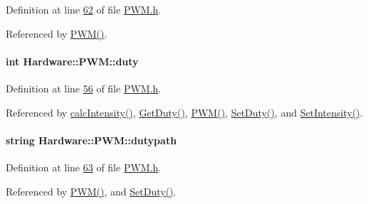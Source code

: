 Definition at line \hyperlink{_p_w_m_8h_source_l00062}{62} of file \hyperlink{_p_w_m_8h_source}{P\+W\+M.\+h}.



Referenced by \hyperlink{_p_w_m_8cpp_source_l00015}{P\+W\+M()}.

\hypertarget{class_hardware_1_1_p_w_m_a3309b2645c4c817384d91f33f0df5d64}{}
\paragraph[{duty}]{\setlength{\rightskip}{0pt plus 5cm}int Hardware\+::\+P\+W\+M\+::duty\hspace{0.3cm}{\ttfamily [private]}}\label{class_hardware_1_1_p_w_m_a3309b2645c4c817384d91f33f0df5d64}


Definition at line \hyperlink{_p_w_m_8h_source_l00056}{56} of file \hyperlink{_p_w_m_8h_source}{P\+W\+M.\+h}.



Referenced by \hyperlink{_p_w_m_8cpp_source_l00070}{calc\+Intensity()}, \hyperlink{_p_w_m_8h_source_l00041}{Get\+Duty()}, \hyperlink{_p_w_m_8cpp_source_l00015}{P\+W\+M()}, \hyperlink{_p_w_m_8cpp_source_l00126}{Set\+Duty()}, and \hyperlink{_p_w_m_8cpp_source_l00090}{Set\+Intensity()}.

\hypertarget{class_hardware_1_1_p_w_m_a53311e9df6960751465d5f0b81192226}{}
\paragraph[{dutypath}]{\setlength{\rightskip}{0pt plus 5cm}string Hardware\+::\+P\+W\+M\+::dutypath\hspace{0.3cm}{\ttfamily [private]}}\label{class_hardware_1_1_p_w_m_a53311e9df6960751465d5f0b81192226}


Definition at line \hyperlink{_p_w_m_8h_source_l00063}{63} of file \hyperlink{_p_w_m_8h_source}{P\+W\+M.\+h}.



Referenced by \hyperlink{_p_w_m_8cpp_source_l00015}{P\+W\+M()}, and \hyperlink{_p_w_m_8cpp_source_l00126}{Set\+Duty()}.

\hypertarget{class_hardware_1_1_p_w_m_afcfc81ddeeb9c510ad4d00b215477d7a}{}
